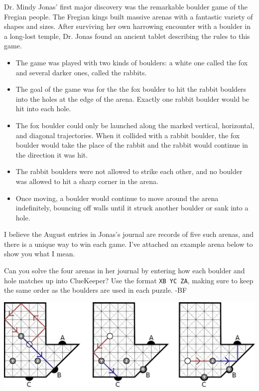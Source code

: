 Dr. Mindy Jonas' first major discovery was the remarkable boulder game of the Fregian people. 
The Fregian kings built massive arenas with a fantastic variety of shapes and sizes. 
After surviving her own harrowing encounter with a boulder in a long-lost temple, 
Dr. Jonas found an ancient tablet describing the rules to this game.

\begin{itemize}
\item The game was played with two kinds of boulders: a white one called the fox 
  and several darker ones, called the rabbits.
\item The goal of the game was for the the fox boulder to hit the rabbit boulders 
  into the holes at the edge of the arena. Exactly one rabbit boulder
  would be hit into each hole.
\item The fox boulder could only be launched along the marked vertical, horizontal, and 
  diagonal trajectories. When it collided with a rabbit boulder, the fox boulder would 
  take the place of the rabbit and the rabbit would continue in the direction it was hit.
\item The rabbit boulders were not allowed to strike each other, and no boulder was 
  allowed to hit a sharp corner in the arena.
\item Once moving, a boulder would continue to move around the arena indefinitely, 
  bouncing off walls until it struck another boulder or sank into a hole.
\end{itemize}

I believe the August entries in Jonas's journal are records of five such arenas, and
there is a unique way to win each game. I've attached an example arena below to show
you what I mean.

Can you solve the four arenas in her journal by entering how each boulder and
hole matches up into ClueKeeper? Use the format \texttt{XB YC ZA}, making sure to
keep the same order as the boulders are used in each puzzle. -BF

\begin{center}
\includegraphics[width=\linewidth]{assets/Billiards_Puzzle_Tutorial.png}
\end{center}

